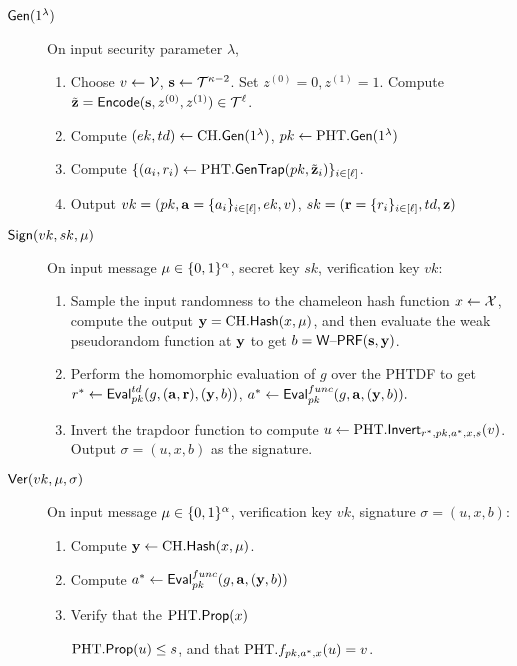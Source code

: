 \begin{description}
\item[$\mathsf{Gen}(1^{\lambda})$] On input security parameter $\lambda$,
\begin{enumerate}
\item Choose $v \gets \mathcal{V}$, $\mathbf{s}\gets
  \mathcal{T}^{\kappa-2}$. Set $z^{(0)}=0,z^{(1)}=1$. Compute $\tilde{\mathbf{z}}
  = \mathsf{Encode}(\mathbf{s}, z^{(0)}, z^{(1)}) \in \mathcal{T}^{\ell}$.
\item Compute $(ek,td) \gets \text{CH}.\mathsf{Gen}(1^{\lambda})$, $pk \gets \text{PHT}.\mathsf{Gen}(1^{\lambda})$
\item Compute  $\{(a_i, r_i) \gets \text{PHT}.\mathsf{GenTrap}(pk,\tilde{\mathbf{z}}_i)\}_{i \in [\ell]}$.
\item Output $vk=(pk,\mathbf{a}=\{a_i\}_{i \in [\ell]},ek,v)$, $sk=(\mathbf{r}=\{r_i\}_{i \in [\ell]},td,\mathbf{z})$
\end{enumerate}
\item[$\mathsf{Sign}(vk,sk,\mu)$] On input message $\mu \in \{0,1\}^{\alpha}$, secret key $sk$,
  verification key $vk$:
\begin{enumerate}
\item Sample the input randomness to the chameleon hash function $x
  \gets \mathcal{X}$, compute the output $\mathbf{y}=\text{CH}.\mathsf{Hash}(x,\mu)$, and
  then evaluate the weak pseudorandom function at $\mathbf{y}$ to get $b=\mathsf{W\text{\textendash}PRF}(\mathbf{s},\mathbf{y})$.
\item Perform the homomorphic evaluation of $g$ over the PHTDF to get $r^* \gets \mathsf{Eval}_{pk}^{td}(g, (\mathbf{a},\mathbf{r}),(\mathbf{y},b))$, $a^* \gets \mathsf{Eval}_{pk}^{func}(g,\mathbf{a},(\mathbf{y},b)).$
\item 
Invert the trapdoor function to compute $u \gets \text{PHT}.\mathsf{Invert}_{r^*,pk,a^*,x,s}(v)$. Output
  $\sigma=(u,x,b)$ as the signature.
\end{enumerate}
\item[$\mathsf{Ver}(vk,\mu,\sigma)$] On input message $\mu \in \{0,1\}^{\alpha}$,
  verification key $vk$, signature $\sigma=(u,x,b)$:
\begin{enumerate}
\item Compute $\mathbf{y} \gets \text{CH}.\mathsf{Hash}(x,\mu)$. 
\item Compute  $a^* \gets \mathsf{Eval}_{pk}^{func}(g,\mathbf{a},(\mathbf{y},b))$
\item 
Verify that the $\text{PHT}.\mathsf{Prop}(x)$

$\text{PHT}.\mathsf{Prop}(u) \leq s$, and that $\text{PHT}.f_{pk,a^*,x}(u)=v$.
\end{enumerate}
\end{description}

